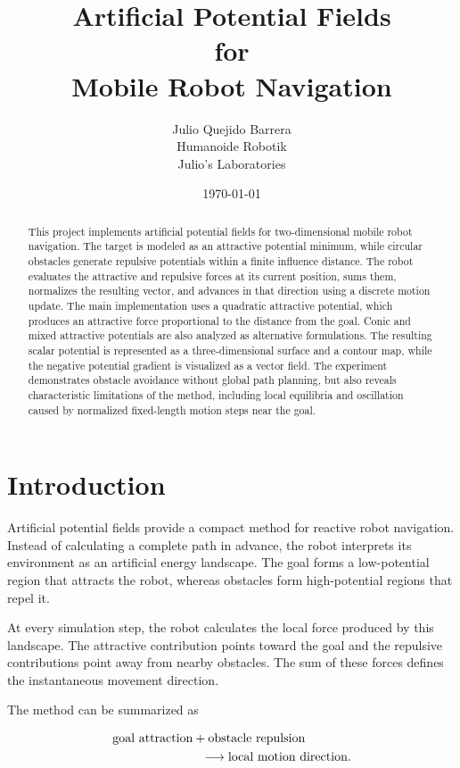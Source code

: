 \documentclass[10pt,twocolumn,a4paper]{article}
\title{
    \textbf{Artificial Potential Fields\\
    for\\
    Mobile Robot Navigation}
}
\author{
    Julio Quejido Barrera\\
    Humanoide Robotik\\
    Julio's Laboratories
}
\date{\today}
\begin{document}
\raggedbottom
\maketitle

\begin{abstract}
This project implements artificial potential fields for two-dimensional
mobile robot navigation. The target is modeled as an attractive potential
minimum, while circular obstacles generate repulsive potentials within a
finite influence distance. The robot evaluates the attractive and repulsive
forces at its current position, sums them, normalizes the resulting vector,
and advances in that direction using a discrete motion update. The main
implementation uses a quadratic attractive potential, which produces an
attractive force proportional to the distance from the goal. Conic and mixed
attractive potentials are also analyzed as alternative formulations. The
resulting scalar potential is represented as a three-dimensional surface and
a contour map, while the negative potential gradient is visualized as a
vector field. The experiment demonstrates obstacle avoidance without global
path planning, but also reveals characteristic limitations of the method,
including local equilibria and oscillation caused by normalized fixed-length
motion steps near the goal.
\end{abstract}

\section{Introduction}

Artificial potential fields provide a compact method for reactive robot
navigation. Instead of calculating a complete path in advance, the robot
interprets its environment as an artificial energy landscape. The goal forms
a low-potential region that attracts the robot, whereas obstacles form
high-potential regions that repel it.

At every simulation step, the robot calculates the local force produced by
this landscape. The attractive contribution points toward the goal and the
repulsive contributions point away from nearby obstacles. The sum of these
forces defines the instantaneous movement direction.

The method can be summarized as

\[
\begin{aligned}
    &\text{goal attraction}
    +
    \text{obstacle repulsion} \\
    &\hspace{2.5cm}\longrightarrow
    \text{local motion direction}.
\end{aligned}
\]
\end{document}
